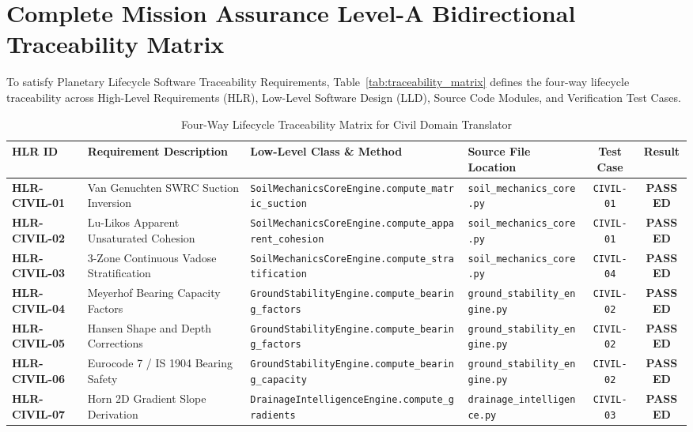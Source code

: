 \documentclass[11pt,a4paper]{article}
\theoremstyle{definition}
\theoremstyle{remark}
\begin{document}
\section{Complete Mission Assurance Level-A Bidirectional Traceability Matrix}

To satisfy Planetary Lifecycle Software Traceability Requirements, Table~\ref{tab:traceability_matrix} defines the four-way lifecycle traceability across High-Level Requirements (HLR), Low-Level Software Design (LLD), Source Code Modules, and Verification Test Cases.

\begin{table}[htbp]
\centering
\scriptsize
\caption{Four-Way Lifecycle Traceability Matrix for Civil Domain Translator}
\begin{tabular}{lp{4.2cm}lp{2.8cm}cc}
\toprule
\textbf{HLR ID} & \textbf{Requirement Description} & \textbf{Low-Level Class \& Method} & \textbf{Source File Location} & \textbf{Test Case} & \textbf{Result} \\
\midrule
\textbf{HLR-CIVIL-01} & Van Genuchten SWRC Suction Inversion & \texttt{SoilMechanicsCoreEngine.compute\_matric\_suction} & \texttt{soil\_mechanics\_core.py} & \texttt{CIVIL-01} & \textbf{PASSED} \\
\textbf{HLR-CIVIL-02} & Lu-Likos Apparent Unsaturated Cohesion & \texttt{SoilMechanicsCoreEngine.compute\_apparent\_cohesion} & \texttt{soil\_mechanics\_core.py} & \texttt{CIVIL-01} & \textbf{PASSED} \\
\textbf{HLR-CIVIL-03} & 3-Zone Continuous Vadose Stratification & \texttt{SoilMechanicsCoreEngine.compute\_stratification} & \texttt{soil\_mechanics\_core.py} & \texttt{CIVIL-04} & \textbf{PASSED} \\
\textbf{HLR-CIVIL-04} & Meyerhof Bearing Capacity Factors & \texttt{GroundStabilityEngine.compute\_bearing\_factors} & \texttt{ground\_stability\_engine.py} & \texttt{CIVIL-02} & \textbf{PASSED} \\
\textbf{HLR-CIVIL-05} & Hansen Shape and Depth Corrections & \texttt{GroundStabilityEngine.compute\_bearing\_factors} & \texttt{ground\_stability\_engine.py} & \texttt{CIVIL-02} & \textbf{PASSED} \\
\textbf{HLR-CIVIL-06} & Eurocode 7 / IS 1904 Bearing Safety & \texttt{GroundStabilityEngine.compute\_bearing\_capacity} & \texttt{ground\_stability\_engine.py} & \texttt{CIVIL-02} & \textbf{PASSED} \\
\textbf{HLR-CIVIL-07} & Horn 2D Gradient Slope Derivation & \texttt{DrainageIntelligenceEngine.compute\_gradients} & \texttt{drainage\_intelligence.py} & \texttt{CIVIL-03} & \textbf{PASSED} \\

\end{tabular}
\end{table}
\end{document}

